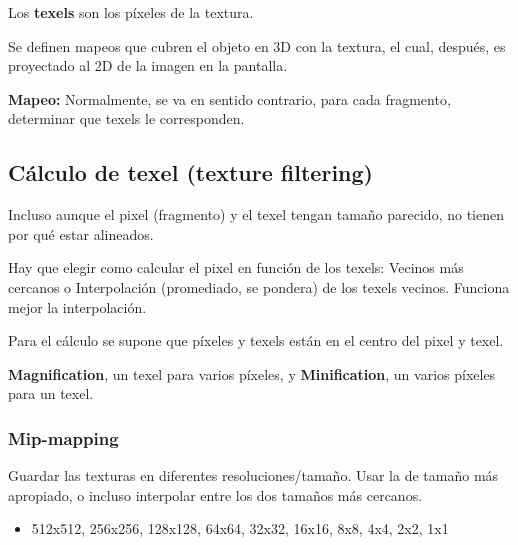 Los \textbf{texels} son los píxeles de la textura.

Se definen mapeos que cubren el objeto en 3D con la textura, el cual, después, es proyectado al 2D de la imagen en la pantalla.

\textbf{Mapeo:} Normalmente, se va en sentido contrario, para cada fragmento, determinar que texels le corresponden.

\subsection{Cálculo de texel (texture filtering)}
Incluso aunque el pixel (fragmento) y el texel tengan tamaño parecido, no tienen por qué estar alineados.

Hay que elegir como calcular el pixel en función de los texels: Vecinos más cercanos o Interpolación (promediado, se pondera) de los texels vecinos. Funciona mejor la interpolación.

Para el cálculo se supone que píxeles y texels están en el centro  del pixel y texel.

\textbf{Magnification}, un texel para varios píxeles, y \textbf{Minification}, un varios píxeles para un texel.

\subsubsection{Mip-mapping} 
Guardar las texturas en diferentes resoluciones/tamaño. Usar la de tamaño más apropiado, o incluso interpolar entre los dos tamaños más cercanos. 
\begin{itemize}
    \item 512x512, 256x256, 128x128, 64x64, 32x32, 16x16, 8x8, 4x4, 2x2, 1x1
\end{itemize}

